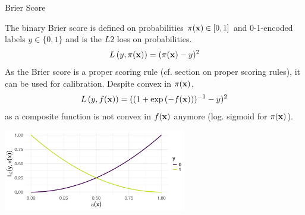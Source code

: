 \documentclass[11pt,compress,t,notes=noshow, xcolor=table]{beamer}
\begin{document}


\begin{vbframe}{Brier Score}

The binary Brier score is defined on probabilities $\pi(\mathbf{x}) \in [0, 1]$ and 0-1-encoded labels $y \in \{0, 1\}$ and is the $L2$ loss on probabilities.
\begin{equation*}
L\left(y, \pi(\mathbf{x})\right) = (\pi(\mathbf{x}) - y)^2
\end{equation*}
As the Brier score is a proper scoring rule (cf. section on proper scoring rules), it can be used for calibration. %
Despite convex in $\pi(\mathbf{x})$, $$L\left(y, f(\mathbf{x})\right)=((1+\exp{(-f(\mathbf{x}))})^{-1}-y)^2$$ as a composite function is not convex in $f(\mathbf{x})$ anymore (log. sigmoid for $\pi(\mathbf{x})$).
\vspace{-0.2cm}
\begin{center}
\includegraphics[width = 0.6\textwidth]{figure/brier.png}
\end{center}


\end{vbframe}
\end{document}
